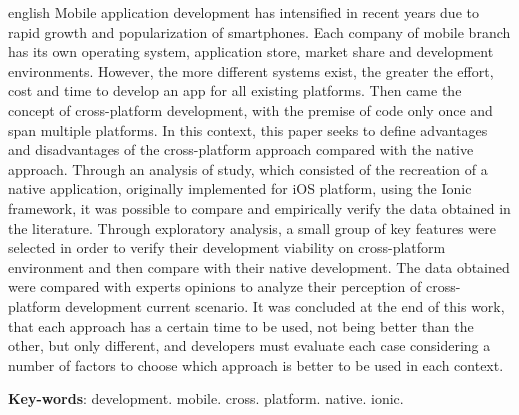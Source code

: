 \begin{resumo}[Abstract]
\begin{otherlanguage*}{english}
  Mobile application development has intensified in recent years due to rapid growth and popularization of smartphones. Each company of 
  mobile branch has its own operating system, application store, market share and development environments. 
  However, the more different systems exist, the greater the effort, cost and time to develop an app for all existing platforms. Then came the concept of cross-platform development, 
  with the premise of code only once and span multiple platforms. In this context, this paper seeks to define advantages and disadvantages of the cross-platform approach 
  compared with the native approach. Through an analysis of study, which consisted of the recreation of a native application, originally implemented for iOS platform, 
  using the Ionic framework, it was possible to compare and empirically verify the data obtained in the literature. Through exploratory analysis, a small group of key features were selected
  in order to verify their development viability on cross-platform environment and then compare with their native development. The data obtained were compared with experts opinions to 
  analyze their perception of cross-platform development current scenario. It was concluded at the end of this work, that each approach has a certain time 
  to be used, not being better than the other, but only different, and developers must evaluate each case considering a number of factors to choose which approach is better to be used in each context.

  \vspace{\onelineskip}

  \noindent 
  \textbf{Key-words}: development. mobile. cross. platform. native. ionic.
 \end{otherlanguage*}
\end{resumo}
